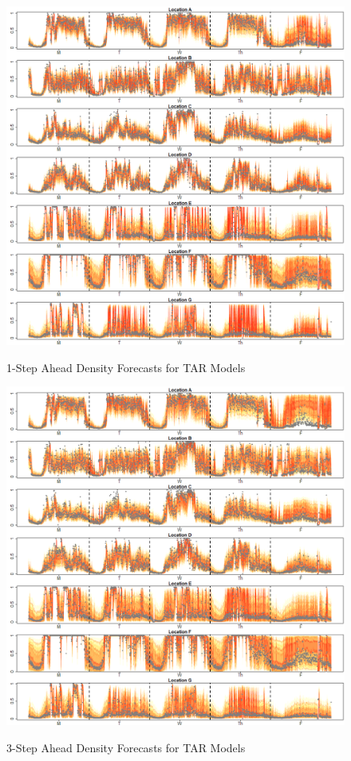 \begin{figure}[htbp]
\caption{1-Step Ahead Density Forecasts for TAR Models}
\includegraphics[width=\textwidth]{DENS1Plots}
\label{fig:DENS1Plots}
\end{figure}


\begin{figure}[htbp]
\caption{3-Step Ahead Density Forecasts for TAR Models}
\includegraphics[width=\textwidth]{DENS3Plots}
\label{fig:DENS3Plots}
\end{figure}

